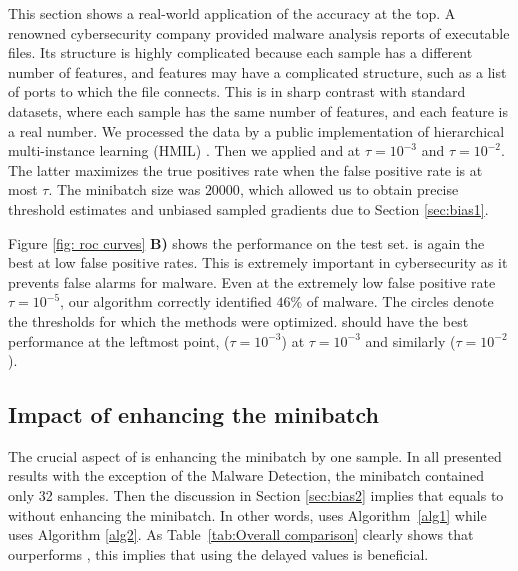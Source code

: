 This section shows a real-world application of the accuracy at the top. A renowned cybersecurity company provided malware analysis reports of executable files. Its structure is highly complicated because each sample has a different number of features, and features may have a complicated structure, such as a list of ports to which the file connects. This is in sharp contrast with standard datasets, where each sample has the same number of features, and each feature is a real number. We processed the data by a public implementation of hierarchical multi-instance learning (HMIL) \cite{pevny2017using}. Then we applied \DeepTopPush and \PatMatNP at $\tau=10^{-3}$ and $\tau=10^{-2}$. The latter maximizes the true positives rate when the false positive rate is at most $\tau$. The minibatch size was $20000$, which allowed us to obtain precise threshold estimates and unbiased sampled gradients due to Section \ref{sec:bias1}.

Figure \ref{fig: roc curves} \textbf{B)} shows the performance on the test set. \DeepTopPush is again the best at low false positive rates. This is extremely important in cybersecurity as it prevents false alarms for malware. Even at the extremely low false positive rate $\tau=10^{-5}$, our algorithm correctly identified $46\%$ of malware. The circles denote the thresholds for which the methods were optimized. \DeepTopPush should have the best performance at the leftmost point, \PatMatNP ($\tau=10^{-3}$) at $\tau=10^{-3}$ and similarly \PatMatNP($\tau=10^{-2}$).

\subsection{Impact of enhancing the minibatch}\label{sec:delay}

The crucial aspect of \DeepTopPush is enhancing the minibatch by one sample. In all presented results with the exception of the Malware Detection, the minibatch contained only 32 samples. Then the discussion in Section \ref{sec:bias2} implies that \PatMatNP equals to \DeepTopPush without enhancing the minibatch. In other words, \PatMatNP uses Algorithm~\ref{alg1} while \DeepTopPush uses Algorithm \ref{alg2}. As Table~\ref{tab:Overall comparison} clearly shows that \DeepTopPush ourperforms \PatMatNP, this implies that using the delayed values is beneficial.

